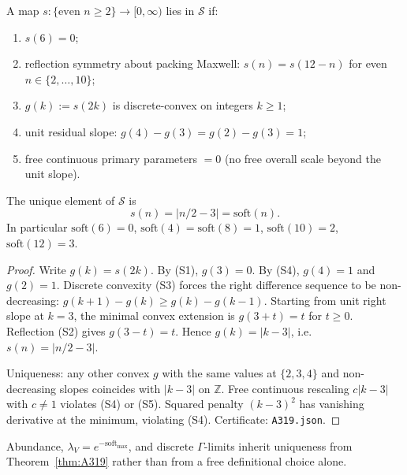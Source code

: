 \begin{definition}
\label{def:A319-S}
A map $s:\{\text{even }n\ge 2\}\to[0,\infty)$ lies in $\mathcal{S}$ if:
\begin{enumerate}[label=(S\arabic*)]
\item $s(6)=0$;
\item reflection symmetry about packing Maxwell: $s(n)=s(12-n)$ for even $n\in\{2,\ldots,10\}$;
\item $g(k):=s(2k)$ is discrete-convex on integers $k\ge 1$;
\item unit residual slope: $g(4)-g(3)=g(2)-g(3)=1$;
\item free continuous primary parameters $=0$ (no free overall scale beyond the unit slope).
\end{enumerate}
\end{definition}

\begin{theorem}
\label{thm:A319}
The unique element of $\mathcal{S}$ is
\begin{equation}
s(n)=\bigl|n/2-3\bigr|=\mathrm{soft}(n).
\end{equation}
In particular $\mathrm{soft}(6)=0$, $\mathrm{soft}(4)=\mathrm{soft}(8)=1$, $\mathrm{soft}(10)=2$, $\mathrm{soft}(12)=3$.
\end{theorem}

\begin{proof}
Write $g(k)=s(2k)$. By (S1), $g(3)=0$. By (S4), $g(4)=1$ and $g(2)=1$. Discrete convexity (S3) forces the right difference sequence to be non-decreasing: $g(k+1)-g(k)\ge g(k)-g(k-1)$. Starting from unit right slope at $k=3$, the minimal convex extension is $g(3+t)=t$ for $t\ge 0$. Reflection (S2) gives $g(3-t)=t$. Hence $g(k)=|k-3|$, i.e.\ $s(n)=|n/2-3|$.

Uniqueness: any other convex $g$ with the same values at $\{2,3,4\}$ and non-decreasing slopes coincides with $|k-3|$ on $\mathbb{Z}$. Free continuous rescaling $c|k-3|$ with $c\neq 1$ violates (S4) or (S5). Squared penalty $(k-3)^2$ has vanishing derivative at the minimum, violating (S4). Certificate: \texttt{A319.json}.
\end{proof}

\begin{remark}
Abundance, $\lambda_V=e^{-\mathrm{soft}_{\max}}$, and discrete $\Gamma$-limits inherit uniqueness from Theorem~\ref{thm:A319} rather than from a free definitional choice alone.
\end{remark}

